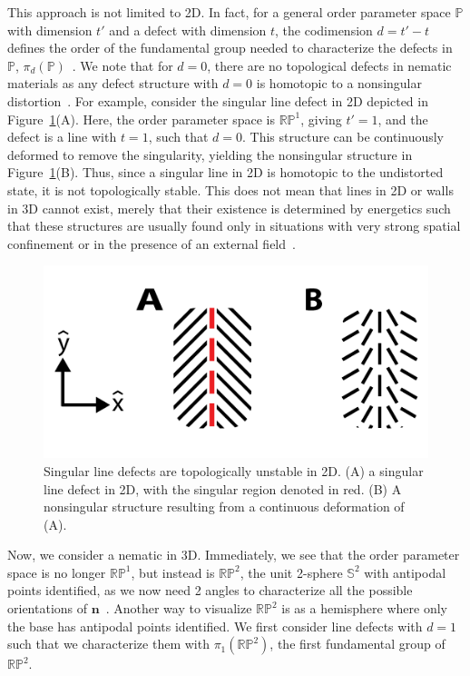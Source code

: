 This approach is not limited to 2D.
In fact, for a general order parameter space $\mathbb{P}$ with dimension $t'$ and a defect with dimension $t$, the codimension $d = t'-t$ defines the order of the fundamental group needed to characterize the defects in $\mathbb{P}$, $\pi_{d}(\mathbb{P})$~\cite{RN236}.
We note that for $d=0$, there are no topological defects in nematic materials as any defect structure with $d=0$ is homotopic to a nonsingular distortion~\cite{RN196}. For example, consider the singular line defect in 2D depicted in Figure~\ref{f:2-Smearing}(A).
Here, the order parameter space is $\mathbb{R}\mathbb{P}^1$, giving $t' = 1$, and the defect is a line with $t = 1$, such that $d = 0$.
This structure can be continuously deformed to remove the singularity, yielding the nonsingular structure in Figure~\ref{f:2-Smearing}(B).
Thus, since a singular line in 2D is homotopic to the undistorted state, it is not topologically stable.
This does not mean that lines in 2D or walls in 3D cannot exist, merely that their existence is determined by energetics such that these structures are usually found only in situations with very strong spatial confinement or in the presence of an external field~\cite{RN33,RN175}.\\
\begin{figure}[h]
  \centering
  \includegraphics{figures/C2/Ch2-Figs_Smearing.png}
  \caption{Singular line defects are topologically unstable in 2D.
  (A) a singular line defect in 2D, with the singular region denoted in red.
  (B) A nonsingular structure resulting from a continuous deformation of (A).}\label{f:2-Smearing}
\end{figure}

Now, we consider a nematic in 3D.
Immediately, we see that the order parameter space is no longer $\mathbb{R}\mathbb{P}^1$, but instead is $\mathbb{R}\mathbb{P}^2$, the unit 2-sphere $\mathbb{S}^2$ with antipodal points identified, as we now need 2 angles to characterize all the possible orientations of $\mathbf{n}$~\cite{RN196,RN153,RN236}.
Another way to visualize $\mathbb{R}\mathbb{P}^2$ is as a hemisphere where only the base has antipodal points identified.
We first consider line defects with $d=1$ such that we characterize them with $\pi_{1}(\mathbb{R}\mathbb{P}^2)$, the first fundamental group of $\mathbb{R}\mathbb{P}^2$.

